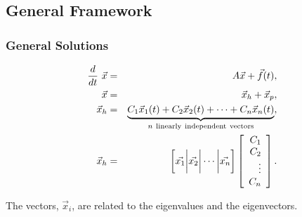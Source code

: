 \subsection{General Framework}

\begin{frame}
  \frametitle{General Solutions}

  \begin{eqnarray*}
    \deriv{~}{t} \vec{x}  & = & A \vec{x} + \vec{f}(t), \\
    \vec{x} & = & \vec{x}_h + \vec{x}_p, \\
    \vec{x}_h & = & \underbrace{C_1 \vec{x}_1(t) + C_2 \vec{x}_2(t) + \cdots + C_n \vec{x}_n(t)}_{n~\mathrm{linearly~independent~vectors}}, \\
    \vec{x}_h & = & \left[ \vec{x_1} \bigg| \vec{x_2} \bigg| \cdots \bigg| \vec{x_n} \right]
    \left[
      \begin{array}{rr}
        C_1 \\ C_2 \\ \vdots \\ C_n
      \end{array}
    \right].
  \end{eqnarray*}

  The vectors, $\vec{x}_i$, are related to the eigenvalues and the eigenvectors.

\end{frame}
